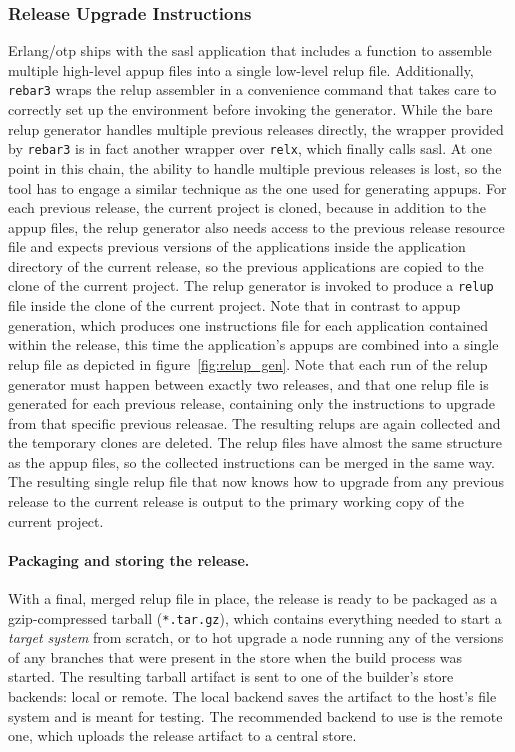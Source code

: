 {\subsubsection{Release Upgrade Instructions} Erlang/\acrshort{otp} ships with the \acrfull{sasl} application that includes a function to assemble multiple high-level \acrfull{appup} files into a single low-level \acrfull{relup} file. Additionally, \lstinline|rebar3| wraps the \acrshort{relup} assembler in a convenience command that takes care to correctly set up the environment before invoking the generator. While the bare \acrshort{relup} generator handles multiple previous releases directly, the wrapper provided by \lstinline|rebar3| is in fact another wrapper over \lstinline|relx|, which finally calls \acrshort{sasl}. At one point in this chain, the ability to handle multiple previous releases is lost, so the tool has to engage a similar technique as the one used for generating \acrshort{appup}s. For each previous release, the current project is cloned, because in addition to the \acrshort{appup} files, the \acrshort{relup} generator also needs access to the previous release resource file and expects previous versions of the applications inside the application directory of the current release, so the previous applications are copied to the clone of the current project. The \acrshort{relup} generator is invoked to produce a \lstinline|relup| file inside the clone of the current project. Note that in contrast to \acrshort{appup} generation, which produces one instructions file for each application contained within the release, this time the application's \acrshort{appup}s are combined into a single \acrshort{relup} file as depicted in figure~\ref{fig:relup_gen}. Note that each run of the \acrshort{relup} generator must happen between exactly two releases, and that one \acrshort{relup} file is generated for each previous release, containing only the instructions to upgrade from that specific previous releasae. The resulting \acrshort{relup}s are again collected and the temporary clones are deleted. The \acrshort{relup} files have almost the same structure as the \acrshort{appup} files, so the collected instructions can be merged in the same way. The resulting single \acrshort{relup} file that now knows how to upgrade from any previous release to the current release is output to the primary working copy of the current project.

\paragraph{Packaging and storing the release.} With a final, merged \acrshort{relup} file in place, the release is ready to be packaged as a gzip-compressed tarball (\lstinline|*.tar.gz|), which contains everything needed to start a \emph{target system} from scratch, or to hot upgrade a node running any of the versions of any branches that were present in the store when the build process was started. The resulting tarball artifact is sent to one of the builder's store backends: local or remote. The local backend saves the artifact to the host's file system and is meant for testing. The recommended backend to use is the remote one, which uploads the release artifact to a central store.

}
